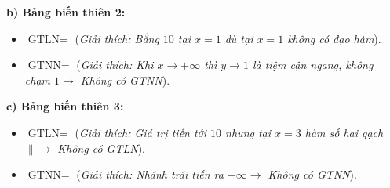 \documentclass[12pt,a4paper]{article}
\begin{document}
\vspace{0.25cm}

\noindent\textbf{b) Bảng biến thiên 2:}
\begin{center}
\end{center}
\vspace{-0.2cm}
\begin{itemize}\setlength{\itemsep}{2pt}\small
    \item $\text{GTLN} = $ \dotfill (\textit{Giải thích: Bằng $10$ tại $x=1$ dù tại $x=1$ không có đạo hàm}).
    \item $\text{GTNN} = $ \dotfill (\textit{Giải thích: Khi $x \to +\infty$ thì $y \to 1$ là tiệm cận ngang, không chạm $1 \to$ Không có GTNN}).
\end{itemize}

\vspace{0.25cm}

\noindent\textbf{c) Bảng biến thiên 3:}
\begin{center}
\end{center}
\vspace{-0.2cm}
\begin{itemize}\setlength{\itemsep}{2pt}\small
    \item $\text{GTLN} = $ \dotfill (\textit{Giải thích: Giá trị tiến tới $10$ nhưng tại $x=3$ hàm số hai gạch $\| \to$ Không có GTLN}).
    \item $\text{GTNN} = $ \dotfill (\textit{Giải thích: Nhánh trái tiến ra $-\infty \to$ Không có GTNN}).
\end{itemize}

\vspace{0.3cm}
\end{document}
